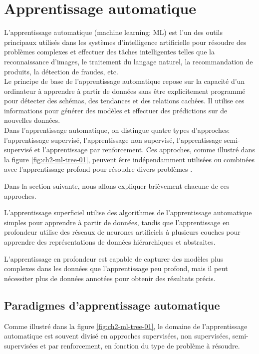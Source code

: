 \section{Apprentissage automatique}
L'apprentissage automatique (machine learning; ML) est l'un des outils principaux utilisés dans les systèmes d'intelligence artificielle pour résoudre des problèmes complexes et effectuer des tâches intelligentes telles que la reconnaissance d'images, le traitement du langage naturel, la recommandation de produits, la détection de fraudes, etc.
\\
Le principe de base de l'apprentissage automatique repose sur la capacité d'un ordinateur à apprendre à partir de données sans être explicitement programmé
pour détecter des schémas, des tendances et des relations cachées. Il utilise ces informations pour générer des modèles et effectuer des prédictions sur de nouvelles données.
\\
Dans l'apprentissage automatique, on distingue quatre types d'approches: l'apprentissage supervisé, l'apprentissage non supervisé, l'apprentissage semi-supervisé et l'apprentissage par renforcement. Ces approches, comme illustré dans la figure \ref{fig:ch2-ml-tree-01}, peuvent être indépendamment utilisées ou combinées avec l'apprentissage profond pour résoudre divers problèmes \cite{Deep_learning_goodfellow2016deep}.

Dans la section suivante, nous allons expliquer brièvement chacune de ces approches.

L'apprentissage superficiel utilise des algorithmes de l’apprentissage automatique simples pour apprendre à partir de données, tandis que l'apprentissage en profondeur utilise des réseaux de neurones artificiels à plusieurs couches pour apprendre des représentations de données hiérarchiques et abstraites. 

L'apprentissage en profondeur est capable de capturer des modèles plus complexes dans les données que l'apprentissage peu profond, mais il peut nécessiter plus de données annotées pour obtenir des résultats précis.

\subsection{Paradigmes d'apprentissage automatique}
Comme illustré dans la figure \ref{fig:ch2-ml-tree-01}, le domaine de l’apprentissage automatique est souvent divisé en approches supervisées, non supervisées, semi-supervisées et par renforcement, en fonction du type de problème à résoudre.

